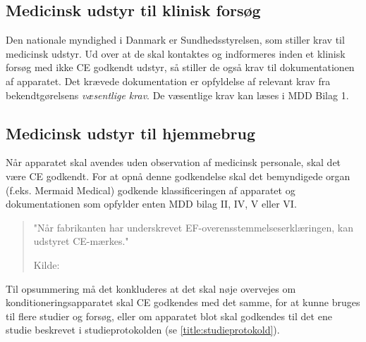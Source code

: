 \subsection{Medicinsk udstyr til klinisk forsøg}
Den nationale myndighed i Danmark er Sundhedsstyrelsen, som stiller krav til medicinsk udstyr. Ud over at de skal kontaktes og indformeres inden et klinisk forsøg med ikke CE godkendt udstyr, så stiller de også krav til dokumentationen af apparatet. Det krævede dokumentation er opfyldelse af relevant krav fra bekendtgørelsens \textit{væsentlige krav}. De væsentlige krav kan læses i MDD Bilag 1.

\subsection{Medicinsk udstyr til hjemmebrug}
Når apparatet skal avendes uden observation af medicinsk personale, skal det være CE godkendt. For at opnå denne godkendelse skal det bemyndigede organ (f.eks. Mermaid Medical) godkende klassificeringen af apparatet og dokumentationen som opfylder enten MDD bilag II, IV, V eller VI. 

\begin{quote}
	"Når fabrikanten har underskrevet EF-overensstemmelseserklæringen, kan udstyret CE-mærkes."
	
	Kilde: 
\end{quote}

Til opsummering må det konkluderes at det skal nøje overvejes om konditioneringsapparatet skal CE godkendes med det samme, for at kunne bruges til flere studier og forsøg, eller om apparatet blot skal godkendes til det ene studie beskrevet i studieprotokolden (se \ref{title:studieprotokold}).


